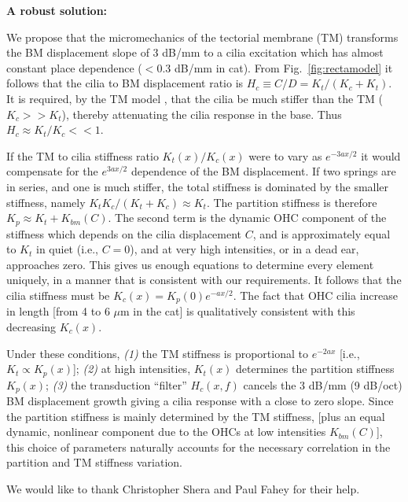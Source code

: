 \documentclass{ws-p8-50x6-00}
\newcommand{\commentX}[1]{}%
\newcommand{\bibpath}{/home/jba/doc/bib}
\newcommand{\Fig}[1]{Fig.~\ref{fig:#1}}
\newcommand{\paragraph}[1]{{\bf #1}}
\begin{document}
\paragraph{A robust solution:}
	\commentX{
There might be several possible explanations to the slope and BM suppression
discrepancies.  Perhaps the inner and outer hair cells (OHC) have significantly
different sensitivities, and vary as \( e^{-2ax} \).  However, there is no
evidence for an exponentially varying sensitivity of the hair cells;
if anything, evidence suggests that their sensitivity \emph{increases} as a
function of \( x \), due to the increasing cilia length with place.}
We propose that the micromechanics of the tectorial membrane (TM) transforms
the BM displacement slope of 3 dB/mm to a cilia excitation which has almost
constant place dependence ($<$0.3 dB/mm in cat).
From \Fig{rectamodel} it follows that the cilia to BM displacement ratio is
	$H_c \equiv C/D = K_t/(K_c+K_t)$.  
It is required, by the TM model \cite{Allen80}, that
the cilia be much stiffer than the TM ($K_c >> K_t$), thereby attenuating
the cilia response in the base.  Thus $H_c \approx K_t/K_c << 1 $.

If the TM to cilia stiffness ratio $K_t(x)/K_c(x)$ were to vary as
	\( e^{-3ax/2} \)
it would compensate for the \( e^{3ax/2} \) dependence of the BM displacement.
If two springs are in series, and one is much stiffer, the total stiffness is
dominated by the smaller stiffness, namely
	\( K_t K_c/(K_t + K_c) \approx K_t \).
The partition stiffness is therefore $K_p \approx K_t +K_{bm}(C)$.
The second term is the dynamic OHC component of the stiffness which depends
on the cilia displacement $C$, and is approximately equal to $K_t$ in
quiet (i.e., $C=0$), and at very high intensities, or in a dead ear, approaches zero.
This gives us enough equations to determine every element uniquely,
in a manner that is consistent with our requirements.
It follows that the cilia stiffness must be
	\( K_c(x) = K_p(0) e^{-ax/2} \).
The fact that OHC cilia increase in length [from 4 to 6 $\mu$m in the cat] is
qualitatively consistent with this decreasing $K_c(x)$.

Under these conditions,
{\it (1)} the TM stiffness is proportional to
	\( e^{-2ax} \) [i.e., \(K_t \propto K_p(x)\)];
{\it (2)} at high intensities, $K_t(x)$ determines the partition stiffness $K_p(x)$;
{\it (3)} the transduction ``filter'' $H_c(x,f)$ cancels the 3 dB/mm (9 dB/oct)
BM displacement growth giving a cilia response with a close to zero slope. 
Since the partition stiffness is mainly determined by the TM stiffness,
[plus an equal dynamic, nonlinear component due to the OHCs at low intensities
	\( K_{bm}(C) \)],
this choice of parameters naturally accounts for the necessary correlation
in the partition and TM stiffness variation.

We would like to thank Christopher Shera and Paul Fahey for their help.

\begin{small}
\setlength{\baselineskip}{0.9em}


\end{small}
\vfill{}
\end{document}
